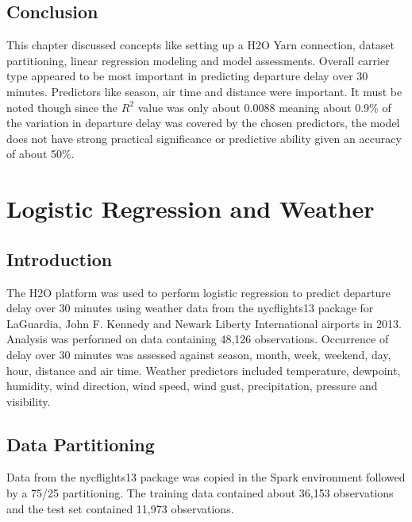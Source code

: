 \documentclass[12pt,twoside]{amherstthesis}
\begin{document}
  \section{Conclusion}\label{conclusion}
  
  This chapter discussed concepts like setting up a H2O Yarn connection,
  dataset partitioning, linear regression modeling and model assessments.
  Overall carrier type appeared to be most important in predicting
  departure delay over 30 minutes. Predictors like season, air time and
  distance were important. It must be noted though since the \(R^{2}\)
  value was only about 0.0088 meaning about 0.9\% of the variation in
  departure delay was covered by the chosen predictors, the model does not
  have strong practical significance or predictive ability given an
  accuracy of about 50\%.
  
  \chapter{Logistic Regression and
  Weather}\label{logistic-regression-and-weather}
  
  \section{Introduction}\label{introduction-3}
  
  The H2O platform was used to perform logistic regression to predict
  departure delay over 30 minutes using weather data from the nycflights13
  package for LaGuardia, John F. Kennedy and Newark Liberty International
  airports in 2013. Analysis was performed on data containing 48,126
  observations. Occurrence of delay over 30 minutes was assessed against
  season, month, week, weekend, day, hour, distance and air time. Weather
  predictors included temperature, dewpoint, humidity, wind direction,
  wind speed, wind gust, precipitation, pressure and visibility.
  
  \section{Data Partitioning}\label{data-partitioning-1}
  
  Data from the nycflights13 package was copied in the Spark environment
  followed by a 75/25 partitioning. The training data contained about
  36,153 observations and the test set contained 11,973 observations.
  
\end{document}
